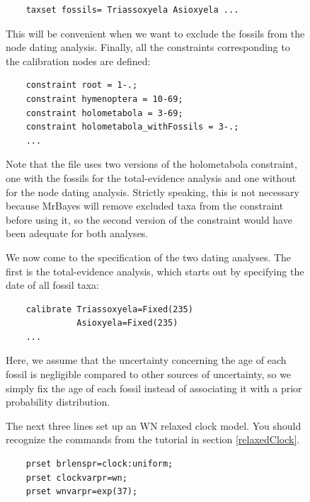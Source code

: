 \documentclass[12pt]{book}
\begin{document}
\begin{figure}[h]
\small
\begin{verbatim}
    taxset fossils= Triassoxyela Asioxyela ...
\end{verbatim}
\normalsize

This will be convenient when we want to exclude the fossils from the node dating analysis. Finally,
all the constraints corresponding to the calibration nodes are defined:

\small
\begin{singlespacing}
\begin{verbatim}
    constraint root = 1-.;
    constraint hymenoptera = 10-69;
    constraint holometabola = 3-69;
    constraint holometabola_withFossils = 3-.;
    ...
\end{verbatim}
\end{singlespacing}
\normalsize

Note that the file uses two versions of the holometabola constraint, one with the fossils for the
total-evidence analysis and one without for the node dating analysis. Strictly speaking, this is
not necessary because MrBayes will remove excluded taxa from the constraint before using it, so the
second version of the constraint would have been adequate for both analyses.

We now come to the specification of the two dating analyses. The first is the total-evidence
analysis, which starts out by specifying the date of all fossil taxa:

\small
\begin{singlespacing}
\begin{verbatim}
    calibrate Triassoxyela=Fixed(235)
              Asioxyela=Fixed(235)
    ...
\end{verbatim}
\end{singlespacing}
\normalsize

Here, we assume that the uncertainty concerning the age of each fossil is negligible compared to
other sources of uncertainty, so we simply fix the age of each fossil instead of associating it
with a prior probability distribution.

The next three lines set up an WN relaxed clock model. You should recognize the commands from the
tutorial in section \ref{relaxedClock}.

\small
\begin{singlespacing}
\begin{verbatim}
    prset brlenspr=clock:uniform;
    prset clockvarpr=wn;
    prset wnvarpr=exp(37);
\end{verbatim}
\end{singlespacing}
\normalsize


\end{figure}
\end{document}
